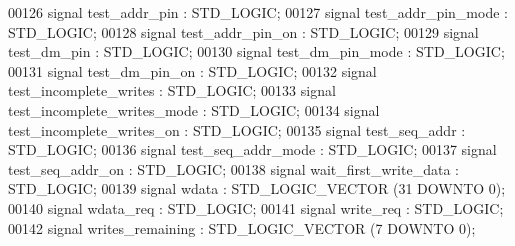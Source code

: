 \begin{DoxyCode}
00126                 \textcolor{keywordflow}{signal} \textcolor{vhdlchar}{test_addr_pin} \textcolor{vhdlchar}{:}  \textcolor{comment}{STD\_LOGIC};
00127                 \textcolor{keywordflow}{signal} \textcolor{vhdlchar}{test_addr_pin_mode} \textcolor{vhdlchar}{:}  \textcolor{comment}{STD\_LOGIC};
00128                 \textcolor{keywordflow}{signal} \textcolor{vhdlchar}{test_addr_pin_on} \textcolor{vhdlchar}{:}  \textcolor{comment}{STD\_LOGIC};
00129                 \textcolor{keywordflow}{signal} \textcolor{vhdlchar}{test_dm_pin} \textcolor{vhdlchar}{:}  \textcolor{comment}{STD\_LOGIC};
00130                 \textcolor{keywordflow}{signal} \textcolor{vhdlchar}{test_dm_pin_mode} \textcolor{vhdlchar}{:}  \textcolor{comment}{STD\_LOGIC};
00131                 \textcolor{keywordflow}{signal} \textcolor{vhdlchar}{test_dm_pin_on} \textcolor{vhdlchar}{:}  \textcolor{comment}{STD\_LOGIC};
00132                 \textcolor{keywordflow}{signal} \textcolor{vhdlchar}{test_incomplete_writes} \textcolor{vhdlchar}{:}  \textcolor{comment}{STD\_LOGIC};
00133                 \textcolor{keywordflow}{signal} \textcolor{vhdlchar}{test_incomplete_writes_mode} \textcolor{vhdlchar}{:}  \textcolor{comment}{STD\_LOGIC};
00134                 \textcolor{keywordflow}{signal} \textcolor{vhdlchar}{test_incomplete_writes_on} \textcolor{vhdlchar}{:}  \textcolor{comment}{STD\_LOGIC};
00135                 \textcolor{keywordflow}{signal} \textcolor{vhdlchar}{test_seq_addr} \textcolor{vhdlchar}{:}  \textcolor{comment}{STD\_LOGIC};
00136                 \textcolor{keywordflow}{signal} \textcolor{vhdlchar}{test_seq_addr_mode} \textcolor{vhdlchar}{:}  \textcolor{comment}{STD\_LOGIC};
00137                 \textcolor{keywordflow}{signal} \textcolor{vhdlchar}{test_seq_addr_on} \textcolor{vhdlchar}{:}  \textcolor{comment}{STD\_LOGIC};
00138                 \textcolor{keywordflow}{signal} \textcolor{vhdlchar}{wait_first_write_data} \textcolor{vhdlchar}{:}  \textcolor{comment}{STD\_LOGIC};
00139                 \textcolor{keywordflow}{signal} \textcolor{vhdlchar}{wdata} \textcolor{vhdlchar}{:}  \textcolor{comment}{STD\_LOGIC\_VECTOR} \textcolor{vhdlchar}{(}\textcolor{vhdllogic}{}\textcolor{vhdllogic}{31} \textcolor{keywordflow}{DOWNTO} \textcolor{vhdllogic}{}\textcolor{vhdllogic}{0}\textcolor{vhdlchar}{)};
00140                 \textcolor{keywordflow}{signal} \textcolor{vhdlchar}{wdata_req} \textcolor{vhdlchar}{:}  \textcolor{comment}{STD\_LOGIC};
00141                 \textcolor{keywordflow}{signal} \textcolor{vhdlchar}{write_req} \textcolor{vhdlchar}{:}  \textcolor{comment}{STD\_LOGIC};
00142                 \textcolor{keywordflow}{signal} \textcolor{vhdlchar}{writes_remaining} \textcolor{vhdlchar}{:}  \textcolor{comment}{STD\_LOGIC\_VECTOR} \textcolor{vhdlchar}{(}\textcolor{vhdllogic}{}\textcolor{vhdllogic}{7} \textcolor{keywordflow}{DOWNTO} \textcolor{vhdllogic}{}\textcolor{vhdllogic}{0}\textcolor{vhdlchar}{)};

\end{DoxyCode}
